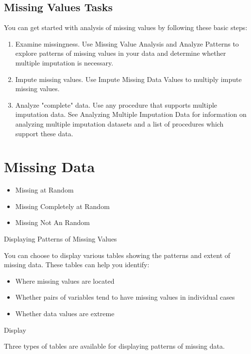\documentclass[a4paper,12pt]{article}
\begin{document}
\subsection{Missing Values Tasks}

You can get started with analysis of missing values by following these basic steps:

\begin{enumerate}
\item  Examine missingness. Use Missing Value Analysis and Analyze Patterns to explore patterns of missing values in your data and determine whether multiple imputation is necessary.
	
\item Impute missing values. Use Impute Missing Data Values to multiply impute missing values.
	
\item Analyze "complete" data. Use any procedure that supports multiple imputation data. See Analyzing Multiple Imputation Data for information on analyzing multiple imputation datasets and a list of procedures which support these data.
\end{enumerate}

\section{Missing Data}

\begin{itemize}
\item Missing at Random
\item Missing Completely at Random
\item Missing Not An Random
\end{itemize}
Displaying Patterns of Missing Values

You can choose to display various tables showing the patterns and extent of missing data. These tables can help you identify:

\begin{itemize}
\item Where missing values are located

\item Whether pairs of variables tend to have missing values in individual cases

\item Whether data values are extreme
\end{itemize}

Display

Three types of tables are available for displaying patterns of missing data.
\end{document}

